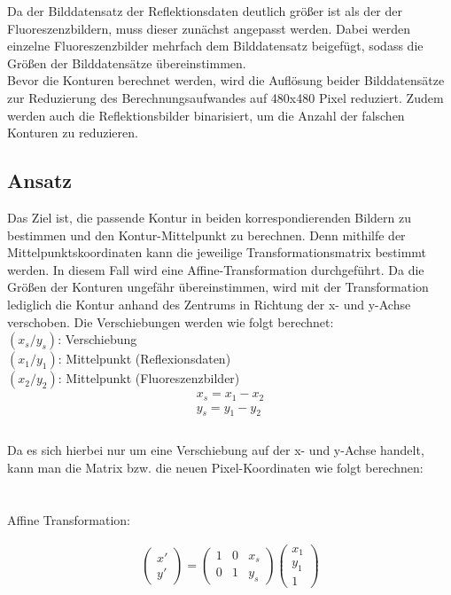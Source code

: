 \documentclass[conference]{IEEEtran}
\begin{document}
Da der Bilddatensatz der Reflektionsdaten deutlich größer ist als der der Fluoreszenzbildern, muss dieser zunächst angepasst werden. Dabei werden einzelne Fluoreszenzbilder mehrfach dem Bilddatensatz beigefügt, sodass die Größen der Bilddatensätze übereinstimmen. \\

Bevor die Konturen berechnet werden, wird die Auflösung beider Bilddatensätze zur Reduzierung des Berechnungsaufwandes auf 480x480 Pixel reduziert. Zudem werden auch die Reflektionsbilder binarisiert, um die Anzahl der falschen Konturen zu reduzieren. 

\subsection{Ansatz}

Das Ziel ist, die passende Kontur in beiden korrespondierenden Bildern zu bestimmen und den Kontur-Mittelpunkt zu berechnen. Denn mithilfe der Mittelpunktskoordinaten kann die jeweilige Transformationsmatrix bestimmt werden. In diesem Fall wird eine Affine-Transformation durchgeführt. Da die Größen der Konturen ungefähr übereinstimmen, wird mit der Transformation lediglich die Kontur anhand des Zentrums in Richtung der x- und y-Achse verschoben. Die Verschiebungen werden wie folgt berechnet: \\

$(x_s/y_s)$: Verschiebung \\
$(x_1/y_1)$: Mittelpunkt (Reflexionsdaten) \\
$(x_2/y_2)$: Mittelpunkt (Fluoreszenzbilder) \\

\begin{equation}
  \begin{aligned}
    x_s = x_1 - x_2\\
      y_s = y_1 - y_2\\ \\
  \end{aligned}
\end{equation}


Da es sich hierbei nur um eine Verschiebung auf der x- und y-Achse handelt, kann man die Matrix bzw. die neuen Pixel-Koordinaten wie folgt berechnen: \\ \\ \\

Affine Transformation: 

\begin{equation}
  \begin{aligned}
\begin{pmatrix} x' \\ y' \end{pmatrix} = 
\left(\begin{array}{ccc} 1 & 0 & x_s \\ 0 & 1 & y_s \end{array}\right)
\left(\begin{array}{r} x_1 \\ y_1 \\ 1 \end{array}\right) 
  \end{aligned}
\end{equation}
\end{document}
